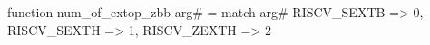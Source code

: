 function num_of_extop_zbb arg# = match arg# {
  RISCV_SEXTB => 0,
  RISCV_SEXTH => 1,
  RISCV_ZEXTH => 2
}
